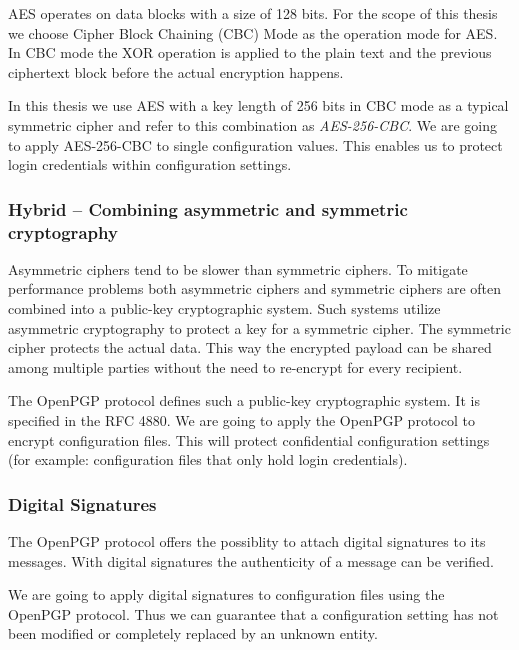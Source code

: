 AES operates on data blocks with a size of 128 bits.\cite{fips197,stallings2014}
For the scope of this thesis we choose Cipher Block Chaining (CBC) Mode as the operation mode for AES.
In CBC mode the XOR operation is applied to the plain text and the previous ciphertext block before the actual encryption happens.\cite{bruceschneier1996,stallings2014}

In this thesis we use AES with a key length of 256 bits in CBC mode as a typical symmetric cipher and refer to this combination as \emph{AES-256-CBC}.
We are going to apply AES-256-CBC to single configuration values.
This enables us to protect login credentials within configuration settings.

\subsubsection{Hybrid -- Combining asymmetric and symmetric cryptography}

Asymmetric ciphers tend to be slower than symmetric ciphers.
To mitigate performance problems both asymmetric ciphers and symmetric ciphers are often combined into a public-key cryptographic system.
Such systems utilize asymmetric cryptography to protect a key for a symmetric cipher.
The symmetric cipher protects the actual data.
This way the encrypted payload can be shared among multiple parties without the need to re-encrypt for every recipient.\cite{stallings2014} 

The OpenPGP protocol defines such a public-key cryptographic system.
It is specified in the RFC 4880.\cite{rfc4880}
We are going to apply the OpenPGP protocol to encrypt configuration files.
This will protect confidential configuration settings (for example: configuration files that only hold login credentials).

\subsubsection{Digital Signatures}

The OpenPGP protocol offers the possiblity to attach digital signatures to its messages.\cite{rfc4880}
With digital signatures the authenticity of a message can be verified.\cite{bruceschneier1996,stallings2014}

We are going to apply digital signatures to configuration files using the OpenPGP protocol.
Thus we can guarantee that a configuration setting has not been modified or completely replaced by an unknown entity.

